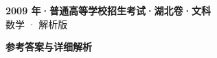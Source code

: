 \documentclass[zihao=-4, a4paper]{ctexart}
\begin{document}
\begin{center}
  {\Large\bfseries 2009 年·普通高等学校招生考试·湖北卷·文科}\\[4pt]
  {\large 数学 · 解析版}
\end{center}
\medskip
{}

\clearpage
{}
\begin{center}{\Large\bfseries 参考答案与详细解析}\end{center}
\medskip

\end{document}
